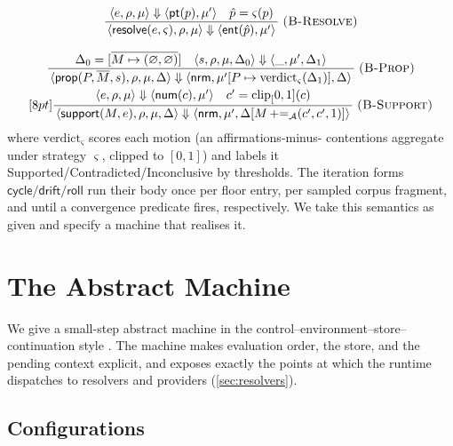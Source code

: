 \documentclass[11pt,a4paper]{article}
\theoremstyle{plain}
\theoremstyle{definition}
\theoremstyle{remark}
\newcommand{\Unit}{[0,1]}
\newcommand{\env}{\rho}
\newcommand{\store}{\mu}
\newcommand{\dbt}{\Delta}
\newcommand{\evalto}{\Downarrow}           %
\newcommand{\infrule}[3]{%
  \ensuremath{\displaystyle\frac{\,#2\,}{\,#3\,}}\;\textsc{(#1)}}
\begin{document}
\begin{gather*}
\infrule{B-Resolve}{\langle e,\env,\store\rangle\evalto\langle\mathsf{pt}(p),
  \store'\rangle\quad \hat p=\varsigma(p)}
  {\langle\mathsf{resolve}(e,\varsigma),\env,\store\rangle\evalto\langle
  \mathsf{ent}(\hat p),\store'\rangle}\\[8pt]
\infrule{B-Prop}{\dbt_0=[\overline{M\mapsto(\varnothing,\varnothing)}]\quad
  \langle s,\env,\store,\dbt_0\rangle\evalto\langle\_,\store',\dbt_1\rangle}
  {\langle\mathsf{prop}(P,\overline M,s),\env,\store,\dbt\rangle\evalto\langle
  \mathsf{nrm},\store'[P\mapsto\mathrm{verdict}_\varsigma(\dbt_1)],\dbt\rangle}\\
  [8pt]
\infrule{B-Support}{\langle e,\env,\store\rangle\evalto\langle\mathsf{num}(c),
  \store'\rangle\quad c'=\mathrm{clip}_\Unit(c)}
  {\langle\mathsf{support}(M,e),\env,\store,\dbt\rangle\evalto\langle\mathsf{nrm}
  ,\store',\dbt[M\,{+}{=}_{\mathcal A}(c',c',1)]\rangle}
\end{gather*}
where $\mathrm{verdict}_\varsigma$ scores each motion (an affirmations-minus-
contentions aggregate under strategy $\varsigma$, clipped to $\Unit$) and labels
it Supported/Contradicted/Inconclusive by thresholds. The iteration forms
$\mathsf{cycle}/\mathsf{drift}/\mathsf{roll}$ run their body once per floor
entry, per sampled corpus fragment, and until a convergence predicate fires,
respectively. We take this semantics as given and specify a machine that
realises it.

\section{The Abstract Machine}
\label{sec:machine}

We give a small-step abstract machine in the control--environment--store--
continuation style \citep{felleisen1992,ager2003}. The machine makes evaluation
order, the store, and the pending context explicit, and exposes exactly the
points at which the runtime dispatches to resolvers and providers
(\cref{sec:resolvers}).

\subsection{Configurations}
\end{document}
